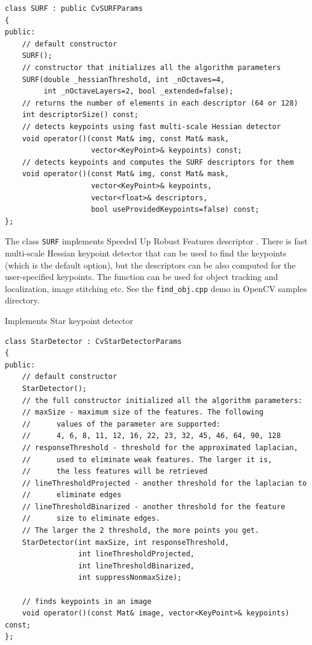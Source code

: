 \begin{lstlisting}
class SURF : public CvSURFParams
{
public:
    // default constructor
    SURF();
    // constructor that initializes all the algorithm parameters
    SURF(double _hessianThreshold, int _nOctaves=4,
         int _nOctaveLayers=2, bool _extended=false);
    // returns the number of elements in each descriptor (64 or 128)
    int descriptorSize() const;
    // detects keypoints using fast multi-scale Hessian detector
    void operator()(const Mat& img, const Mat& mask,
                    vector<KeyPoint>& keypoints) const;
    // detects keypoints and computes the SURF descriptors for them
    void operator()(const Mat& img, const Mat& mask,
                    vector<KeyPoint>& keypoints,
                    vector<float>& descriptors,
                    bool useProvidedKeypoints=false) const;
};
\end{lstlisting}

The class \texttt{SURF} implements Speeded Up Robust Features descriptor \cite{Bay06}.
There is fast multi-scale Hessian keypoint detector that can be used to find the keypoints
(which is the default option), but the descriptors can be also computed for the user-specified keypoints.
The function can be used for object tracking and localization, image stitching etc. See the
\texttt{find\_obj.cpp} demo in OpenCV samples directory.


\label{StarDetector}
Implements Star keypoint detector

\begin{lstlisting}
class StarDetector : CvStarDetectorParams
{
public:
    // default constructor
    StarDetector();
    // the full constructor initialized all the algorithm parameters:
    // maxSize - maximum size of the features. The following 
    //      values of the parameter are supported:
    //      4, 6, 8, 11, 12, 16, 22, 23, 32, 45, 46, 64, 90, 128
    // responseThreshold - threshold for the approximated laplacian,
    //      used to eliminate weak features. The larger it is,
    //      the less features will be retrieved
    // lineThresholdProjected - another threshold for the laplacian to 
    //      eliminate edges
    // lineThresholdBinarized - another threshold for the feature 
    //      size to eliminate edges.
    // The larger the 2 threshold, the more points you get.
    StarDetector(int maxSize, int responseThreshold,
                 int lineThresholdProjected,
                 int lineThresholdBinarized,
                 int suppressNonmaxSize);

    // finds keypoints in an image
    void operator()(const Mat& image, vector<KeyPoint>& keypoints) const;
};
\end{lstlisting}

